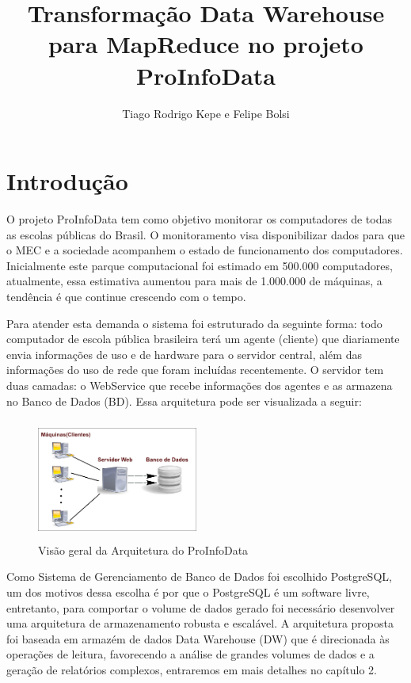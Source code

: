 \documentclass[a4paper,12pt]{article}
\title{Transformação Data Warehouse para MapReduce no projeto ProInfoData}
\author{Tiago Rodrigo Kepe e Felipe Bolsi}
\begin{document}
\maketitle

\section{\textbf{Introdução}}

O projeto ProInfoData tem como objetivo monitorar os computadores de todas as escolas
públicas do Brasil. O monitoramento visa disponibilizar dados para que o MEC e a
sociedade acompanhem o estado de funcionamento dos computadores. Inicialmente este
parque computacional foi estimado em 500.000 computadores, atualmente, essa estimativa
aumentou para mais de 1.000.000 de máquinas, a tendência é que continue crescendo com
o tempo.
 
Para atender esta demanda o sistema foi estruturado da seguinte forma: todo computador
de escola pública brasileira terá um agente (cliente) que diariamente envia informações 
de uso e de hardware para o servidor central, além das informações do uso de rede que
foram incluídas recentemente. O servidor tem duas camadas: o WebService que recebe
informações dos agentes e as armazena no Banco de Dados (BD). Essa arquitetura pode ser
visualizada a seguir:\newline

\begin{figure}[ht]
  \centering
  \includegraphics[width=200px,height=150px]{img/arq-bd.png}
  \caption{Visão geral da Arquitetura do ProInfoData}
\end{figure}

Como Sistema de Gerenciamento de Banco de Dados foi escolhido PostgreSQL, um dos 
motivos dessa escolha é por que o PostgreSQL é um software livre, entretanto,
para comportar o volume de dados gerado foi necessário desenvolver uma arquitetura de
armazenamento robusta e escalável. A arquitetura proposta foi baseada em armazém de
dados Data Warehouse (DW) que é direcionada às operações de leitura, favorecendo a 
análise de grandes volumes de dados e a geração de relatórios complexos, entraremos em
mais detalhes no capítulo 2.
\end{document}
